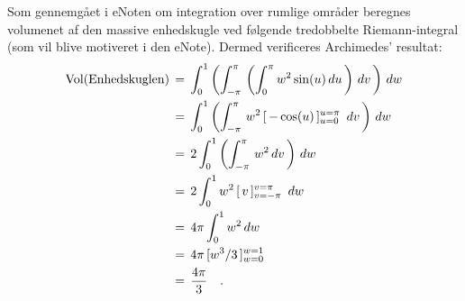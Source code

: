\begin{example} \label{exampKugle}
Som gennemgået i eNoten om integration over rumlige områder beregnes volumenet af den massive enhedskugle ved følgende tredobbelte Riemann-integral (som vil blive motiveret i den eNote). Dermed verificeres {Archimedes'
resultat}:
\begin{equation}
\begin{aligned}
\operatorname{Vol}(\rm{Enhedskuglen}) \, &= \, \int_{0}^{1}\left(\int_{-\pi}^{\pi}\, \left(
\int_{0}^{\pi} w^{2}\sin(u)\, du \, \right)\, dv\, \right)\, dw  \\
&= \,
\int_{0}^{1}\left(\int_{-\pi}^{\pi}\,
w^{2} \,[\,-\cos(u)\,]_{u=0}^{u=\pi}\,\,\, dv\, \right)\, dw \\ &= \,
2\int_{0}^{1}\left(\int_{-\pi}^{\pi}\,
 w^{2}\, dv\, \right)\, dw \\ &= \,
2\int_{0}^{1}
w^{2}\,[\,v \,]_{v=-\pi}^{v=\pi}\,\,\, dw \\ &= \,
4\pi \int_{0}^{1}
w^{2}\, dw \\ &= \,
4\pi\,[w^{3}/3\,]_{w=0}^{w=1} \\ &= \,
\frac{4\pi}{3} \quad .
\end{aligned}
\end{equation}
\end{example}

















